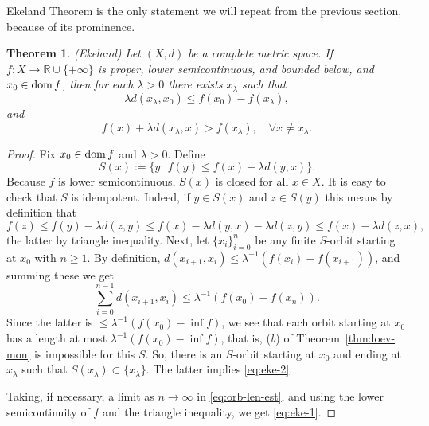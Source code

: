 \documentclass[12pt]{article}
\newtheorem{theorem}{Theorem}[section]
\def\dom{\mathop{\rm dom}}
\begin{document}
    Ekeland Theorem is the only statement we will repeat from the previous section, because of its prominence.
    \begin{theorem}(Ekeland)
        \label{thm:eke-cmp}
        Let $(X,d)$ be a complete metric space.
        If $f: X \rightarrow \mathbb{R} \cup\{+\infty\}$ is proper, lower semicontinuous, and bounded below, and $x_0 \in \dom f$, then for each $\lambda>0$ there exists $x_\lambda$ such that
        \begin{equation}
            \label{eq:eke-1}
            \lambda d(x_\lambda, x_0) \leq f(x_0)- f(x_\lambda),
        \end{equation}
        and
        \begin{equation}
            \label{eq:eke-2}
            f(x)+\lambda d(x_\lambda, x) > f(x_\lambda), \quad \forall x \neq x_\lambda.
        \end{equation}
    \end{theorem}
    \begin{proof}
        Fix $x_0 \in \dom f$ and $\lambda>0$. Define
        $$
            S(x) := \{y:\  f(y) \le f(x) -\lambda d(y,x)\}.
        $$
        Because $f$ is lower semicontinuous, $S(x)$ is closed for all $x\in X$. It is easy to check that $S$ is idempotent. Indeed, if $y\in S(x)$ and $z\in S(y)$ this means by definition that
        $$
            f(z) \le f(y) - \lambda d(z,y) \le f(x) - \lambda d(y,x) - \lambda d(z,y) \le f(x) - \lambda d(z,x),
        $$
        the latter by triangle inequality.
        Next, let $\{x_i\}_{i=0}^n$ be any finite $S$-orbit starting at $x_0$ with $n\ge1$. By definition, $d(x_{i+1},x_i) \le \lambda^{-1}(f(x_i)-f(x_{i+1}))$, and summing these we get
        \begin{equation}
            \label{eq:orb-len-est}
            \sum_{i=0}^{n-1} d(x_{i+1},x_i) \le \lambda^{-1}(f(x_0)-f(x_n)).
        \end{equation}
        Since the latter is $\le \lambda^{-1}(f(x_0)-\inf f)$, we see that each orbit starting at $x_0$ has a length at most $\lambda^{-1}(f(x_0)-\inf f)$, that is, (\emph{b}) of Theorem~\ref{thm:loev-mon} is impossible for this $S$. So, there is an $S$-orbit starting at $x_0$ and ending at $x_\lambda $ such that $S(x_\lambda)\subset \{x_\lambda\}$. The latter implies \eqref{eq:eke-2}.

        Taking, if necessary, a limit as $n\to\infty$ in \eqref{eq:orb-len-est}, and using the lower semicontinuity of $f$ and the triangle inequality, we get \eqref{eq:eke-1}.
    \end{proof}
\end{document}
